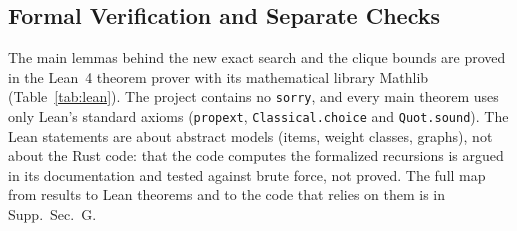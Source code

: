 \documentclass[]{spie}  %
\theoremstyle{plain}
\newcommand{\supp}[1]{Supp.\ Sec.~#1}
\newcommand{\code}[1]{\texttt{#1}}
\begin{document}
\subsection{Formal Verification and Separate Checks}\label{sec:lean}

The main lemmas behind the new exact search and the clique bounds are proved in the Lean~4
theorem prover\cite{moura2021lean} with its mathematical library Mathlib\cite{mathlib2020}
(Table~\ref{tab:lean}). The project contains no \code{sorry}, and every main theorem uses only
Lean's standard axioms (\code{propext}, \code{Classical.choice} and \code{Quot.sound}). The Lean
statements are about abstract models (items, weight classes, graphs), not about the Rust code:
that the code computes the formalized recursions is argued in its documentation and tested
against brute force, not proved. The full map from results to Lean theorems and to the code that
relies on them is in \supp{G}.
\end{document}
